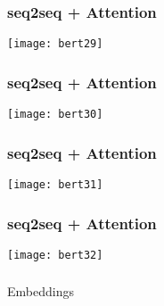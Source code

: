 \begin{frame}[fragile]\frametitle{seq2seq + Attention}

\begin{center}
\texttt{[image: bert29]}
\end{center}	

\end{frame}

\begin{frame}[fragile]\frametitle{seq2seq + Attention}

\begin{center}
\texttt{[image: bert30]}
\end{center}	

\end{frame}

\begin{frame}[fragile]\frametitle{seq2seq + Attention}

\begin{center}
\texttt{[image: bert31]}
\end{center}	

\end{frame}

\begin{frame}[fragile]\frametitle{seq2seq + Attention}

\begin{center}
\texttt{[image: bert32]}
\end{center}	

\end{frame}

\begin{frame}[fragile]\frametitle{}
\begin{center}
{\Large Embeddings}
\end{center}
\end{frame}

